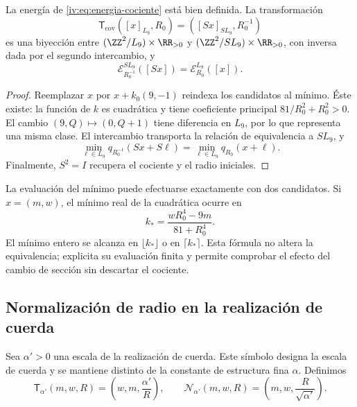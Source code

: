 \begin{theorem}
\label{iv:thm:dualidad-cociente}
La energía de \eqref{iv:eq:energia-cociente} está bien definida.
La transformación
\[
 \mathsf T_{\mathrm{cov}}([x]_{L_9},R_0)
 =([Sx]_{SL_9},R_0^{-1})
\]
es una biyección entre
\((\ZZ^2/L_9)\times\RR_{>0}\) y
\((\ZZ^2/SL_9)\times\RR_{>0}\), con inversa dada por el
segundo intercambio, y
\[
 \mathcal E_{R_0^{-1}}^{SL_9}([Sx])
 =\mathcal E_{R_0}^{L_9}([x]).
\]
\end{theorem}
\begin{proof}
Reemplazar \(x\) por \(x+k_0(9,-1)\) reindexa los candidatos
al mínimo. Éste existe: la función de \(k\) es cuadrática y
tiene coeficiente principal \(81/R_0^2+R_0^2>0\). El cambio
\((9,Q)\mapsto(0,Q+1)\) tiene diferencia en \(L_9\), por
lo que representa una misma clase. El intercambio transporta
la relación de equivalencia a \(SL_9\), y
\[
 \min_{\ell\in L_9}q_{R_0^{-1}}(Sx+S\ell)
 =\min_{\ell\in L_9}q_{R_0}(x+\ell).
\]
Finalmente, \(S^2=I\) recupera el cociente y el radio iniciales.
\end{proof}

La evaluación del mínimo puede efectuarse exactamente con dos
candidatos. Si \(x=(m,w)\), el mínimo real de la cuadrática
ocurre en
\[
 k_* =\frac{wR_0^4-9m}{81+R_0^4}.
\]
El mínimo entero se alcanza en \(\lfloor k_*\rfloor\) o en
\(\lceil k_*\rceil\). Esta fórmula no altera la equivalencia;
explicita su evaluación finita y permite comprobar el efecto
del cambio de sección sin descartar el cociente.

\subsection{Normalización de radio en la realización de cuerda}

Sea \(\alpha'>0\) una escala de la realización de cuerda.
Este símbolo designa la escala de cuerda y se mantiene distinto
de la constante de estructura fina \(\alpha\). Definimos
\begin{equation}
 \mathsf T_{\alpha'}(m,w,R)
 =\left(w,m,\frac{\alpha'}R\right),\qquad
 \mathcal N_{\alpha'}(m,w,R)
 =\left(m,w,\frac R{\sqrt{\alpha'}}\right).
 \label{iv:eq:normalizacion-cuerda}
\end{equation}

